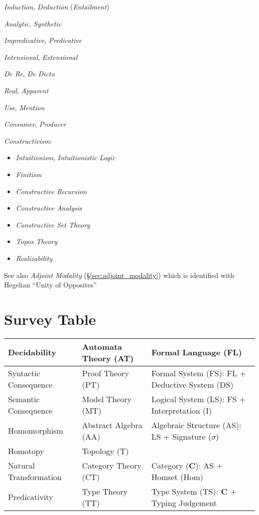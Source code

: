 \emph{Induction}, \emph{Deduction} (\emph{Entailment})

\emph{Analytic}, \emph{Synthetic}

\emph{Impredicative}, \emph{Predicative}

\emph{Intensional}, \emph{Extensional}

\emph{De Re}, \emph{De Dicto}

\emph{Real}, \emph{Apparent}

\emph{Use}, \emph{Mention}

\emph{Consumer}, \emph{Producer}

\emph{Constructivism}:
\begin{itemize}
    \item \emph{Intuitionism}, \emph{Intuitionistic Logic}
    \item \emph{Finitism}
    \item \emph{Constructive Recursion}
    \item \emph{Constructive Analysis}
    \item \emph{Constructive Set Theory}
    \item \emph{Topos Theory}
    \item \emph{Realizability}
\end{itemize}

\fist See also \emph{Adjoint Modality} (\S\ref{sec:adjoint_modality})
which is identified with Hegelian ``Unity of Opposites''



\section{Survey Table}

\begin{tabularx}{\textwidth}{| X | X | X |}
    \hline
    Decidability            & Automata Theory (AT)  & Formal Language (FL) \\
    \hline
    Syntactic Consequence   & Proof Theory (PT)     & Formal System (FS): FL + Deductive System (DS) \\
    \hline
    Semantic Consequence    & Model Theory (MT)     & Logical System (LS): FS + Interpretation (I) \\
    \hline
    Homomorphism            & Abstract Algebra (AA) & Algebraic Structure (AS): LS + Signature ($\sigma$) \\
    \hline
    Homotopy                & Topology (T)          & \\
    \hline
    Natural Transformation  & Category Theory (CT)  & Category ($\mathbf{C}$): AS + Homset (Hom) \\
    \hline
    Predicativity           & Type Theory (TT)      & Type System (TS): $\mathbf{C}$ + Typing Judgement \\
    \hline
\end{tabularx}



